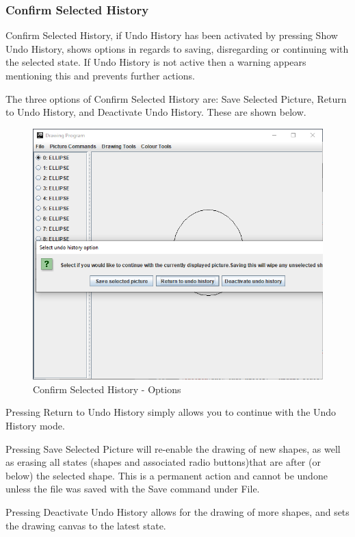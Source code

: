 \documentclass[12pt]{article} %
\begin{document}
\subsubsection{Confirm Selected History}
Confirm Selected History, if Undo History has been activated by pressing Show Undo History, shows options in regards to saving, disregarding or continuing with the selected state. If Undo History is not active then a warning appears mentioning this and prevents further actions. 

The three options of Confirm Selected History are: Save Selected Picture, Return to Undo History, and Deactivate Undo History. These are shown below.

\begin{figure}[H]
\caption{Confirm Selected History - Options}
\centering
\includegraphics[scale=0.75]{pictures/confirmSecondWindow.PNG}
\end{figure}

Pressing Return to Undo History simply allows you to continue with the Undo History mode.

Pressing Save Selected Picture will re-enable the drawing of new shapes, as well as erasing all states (shapes and associated radio buttons)that are after (or below) the selected shape. This is a permanent action and cannot be undone unless the file was saved with the Save command under File.

Pressing Deactivate Undo History allows for the drawing of more shapes, and sets the drawing canvas to the latest state. 
\end{document}
